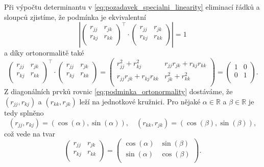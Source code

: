 \documentclass[czech]{article}
\newcommand\R{\ensuremath{\mathbb{R}}}
\begin{document}
Při výpočtu determinantu v \ref{eq:pozadavek_specialni_linearity} eliminací řádků a sloupců zjistíme, že podmínka je ekvivalentní
\[
	\left|
	\begin{pmatrix}
		r_{jj} & r_{jk} \\
		r_{kj} & r_{kk} \\
	\end{pmatrix}^{\top}
	\cdot
	\begin{pmatrix}
		r_{jj} & r_{jk} \\
		r_{kj} & r_{kk} \\
	\end{pmatrix}
	\right| = 1
\]
a díky ortonormalitě také
\begin{equation}
	\label{eq:podminka_ortonormality}
	\begin{pmatrix}
		r_{jj} & r_{jk} \\
		r_{kj} & r_{kk} \\
	\end{pmatrix}^{\top}
	\cdot
	\begin{pmatrix}
		r_{jj} & r_{jk} \\
		r_{kj} & r_{kk} \\
	\end{pmatrix} =
	\begin{pmatrix}
		r_{jj}^2 + r_{kj}^2         & r_{jj}r_{jk} + r_{kj}r_{kk} \\
		r_{jj}r_{jk} + r_{kj}r_{kk} & r_{jk}^2 + r_{kk}^2         \\
	\end{pmatrix} =
	\begin{pmatrix}
		1 & 0 \\
		0 & 1 \\
	\end{pmatrix}.
\end{equation}
Z diagonálních prvků rovnic \ref{eq:podminka_ortonormality} dostáváme, že $(r_{jj},r_{kj})$ a $(r_{kk}, r_{jk})$ leží na jednotkové kružnici. Pro nějaké $\alpha \in \R$ a $\beta \in \R$ je tedy splněno
\[
	(r_{jj},r_{kj}) = (\cos(\alpha), \sin(\alpha)), \quad (r_{kk}, r_{jk}) = (\cos(\beta), \sin(\beta)),
\]
což vede na tvar
\begin{equation}
	\label{eq:podminka_diagonalnich_prvku}
	\begin{pmatrix}
		r_{jj} & r_{jk} \\
		r_{kj} & r_{kk} \\
	\end{pmatrix}  =
	\begin{pmatrix}
		\cos(\alpha) & \sin(\beta) \\
		\sin(\alpha) & \cos(\beta) \\
	\end{pmatrix}.
\end{equation}
\end{document}
